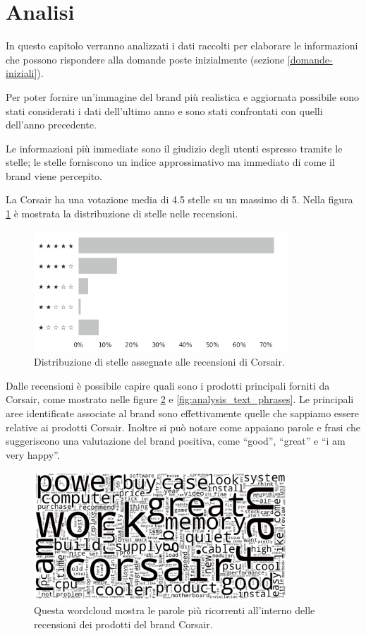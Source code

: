 \section{Analisi}
In questo capitolo verranno analizzati i dati raccolti per elaborare le informazioni che possono rispondere alla domande poste inizialmente (sezione \ref{domande-iniziali}).

Per poter fornire un'immagine del brand più realistica e aggiornata possibile sono stati considerati i dati dell'ultimo anno e sono stati confrontati con quelli dell'anno precedente.

Le informazioni più immediate sono il giudizio degli utenti espresso tramite le stelle; le stelle forniscono un indice approssimativo ma immediato di come il brand viene percepito.

La Corsair ha una votazione media di 4.5 stelle su un massimo di 5. Nella figura \ref{fig:analysis_rating} è mostrata la distribuzione di stelle nelle recensioni.

\begin{figure}[ht]
    \centering
    \includegraphics[width=0.85\textwidth]{images/analysis/rating.png}
    \caption{Distribuzione di stelle assegnate alle recensioni di Corsair.}
    \label{fig:analysis_rating}
\end{figure}

Dalle recensioni è possibile capire quali sono i prodotti principali forniti da Corsair, come mostrato nelle figure \ref{fig:analysis_text} e \ref{fig:analysis_text_phrases}. Le principali aree identificate associate al brand sono effettivamente quelle che sappiamo essere relative ai prodotti Corsair. Inoltre si può notare come appaiano parole e frasi che suggeriscono una valutazione del brand positiva, come ``good'', ``great'' e ``i am very happy''.

\begin{figure}[ht]
    \centering
    \includegraphics[width=0.85\textwidth]{images/analysis/wc_text.png}
    \caption{Questa wordcloud mostra le parole più ricorrenti all'interno delle recensioni dei prodotti del brand Corsair.}
    \label{fig:analysis_text}
\end{figure}

